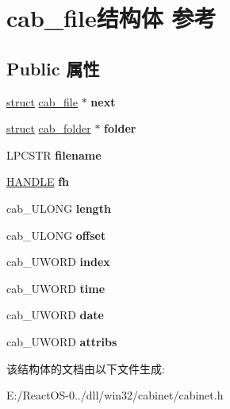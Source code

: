\hypertarget{structcab__file}{}\section{cab\+\_\+file结构体 参考}
\label{structcab__file}
\subsection*{Public 属性}
\begin{DoxyCompactItemize}
\item 
\mbox{\label{structcab__file_ae1610329968d1a0d54e5f8a9eab10c95}} 
\hyperlink{interfacestruct}{struct} \hyperlink{structcab__file}{cab\+\_\+file} $\ast$ {\bfseries next}
\item 
\mbox{\label{structcab__file_a0a3c4e377837e2c3da57d268aadbcf08}} 
\hyperlink{interfacestruct}{struct} \hyperlink{structcab__folder}{cab\+\_\+folder} $\ast$ {\bfseries folder}
\item 
\mbox{\label{structcab__file_a0fdc0b57cba6e03c95129145eab279f3}} 
L\+P\+C\+S\+TR {\bfseries filename}
\item 
\mbox{\label{structcab__file_a4d3a932dc65af6ef1029db56800235e1}} 
\hyperlink{interfacevoid}{H\+A\+N\+D\+LE} {\bfseries fh}
\item 
\mbox{\label{structcab__file_aaadccb40d9fd1e927b4c55d0d90de22a}} 
cab\+\_\+\+U\+L\+O\+NG {\bfseries length}
\item 
\mbox{\label{structcab__file_ac5e975e2909d1409c7afb3c296b28656}} 
cab\+\_\+\+U\+L\+O\+NG {\bfseries offset}
\item 
\mbox{\label{structcab__file_affb3a141c54313e12f7965fe7ba2f77c}} 
cab\+\_\+\+U\+W\+O\+RD {\bfseries index}
\item 
\mbox{\label{structcab__file_a308f22c3aa51a155d36f101fcda33316}} 
cab\+\_\+\+U\+W\+O\+RD {\bfseries time}
\item 
\mbox{\label{structcab__file_a446ddd8fcb7a8cfb2c31b29f5cfedb99}} 
cab\+\_\+\+U\+W\+O\+RD {\bfseries date}
\item 
\mbox{\label{structcab__file_a28a198106af36fccdd48e1005b4d733c}} 
cab\+\_\+\+U\+W\+O\+RD {\bfseries attribs}
\end{DoxyCompactItemize}


该结构体的文档由以下文件生成\+:\begin{DoxyCompactItemize}
\item 
E\+:/\+React\+O\+S-\/0../dll/win32/cabinet/cabinet.\+h\end{DoxyCompactItemize}
